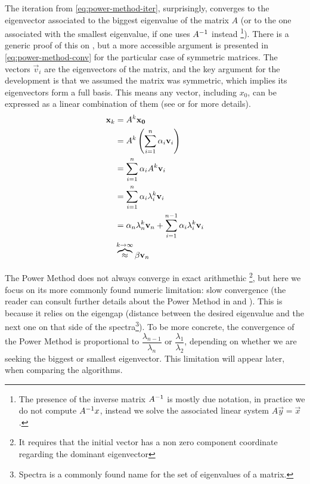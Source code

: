 The iteration from \cref{eq:power-method-iter}, surprisingly,
converges to the eigenvector 
associated to the biggest eigenvalue of the matrix $A$ (or to the one
associated with the smallest eigenvalue, if one uses ${A}^{-1}$ instead
\footnote{The presence of the inverse matrix ${A}^{-1}$ is mostly due
  notation, in practice we do not compute ${A}^{-1}x$, instead we solve the
  associated linear system $A\vec{y} = \vec{x}$.}). There is a
generic proof of this on \cite{saad92}, but a more accessible argument
is presented in \cref{eq:power-method-conv} for the particular case of
symmetric matrices. The vectors 
$\vec{v}_i$ are the eigenvectors of the matrix, and the key argument
for the development is that we
assumed the  matrix was symmetric, which implies its eigenvectors form a full
basis. This means any vector, including $x_0$, can be expressed as a
linear combination of them (see \cite{strang88} or \cite{golub13} for
more details). \\

\begin{align}
  \begin{split}
  \label{eq:power-method-conv}
  \vec{x}_k &= A^{k}\vec{x_0} \\
  &= A^{k}\left(\sum\limits_{\tiny{i=1}}^{n} \alpha_i\vec{v}_i \right) \\
  &= \sum\limits_{\tiny{i=1}}^{n} \alpha_i A^{k} \vec{v}_i  \\
  &= \sum\limits_{\tiny{i=1}}^{n} \alpha_i \lambda_i^{k} \vec{v}_i \\
  &= \alpha_n \lambda_n^{k} \vec{v}_n +
  \sum\limits_{\tiny{i=1}}^{n-1} \alpha_i \lambda_i^{k} \vec{v}_i \\
  & \overbrace{\approx}^{k \to \infty} \beta \vec{v}_n  
  \end{split}
\end{align}


The Power Method does not always converge in exact
arithmethic \footnote{It requires that the initial vector has a non
  zero component coordinate regarding the dominant eigenvector}, but
here we focus on its 
more commonly found numeric limitation: slow convergence (the reader
can consult further details about the Power Method in \cite{golub13}
and \cite{parlett80}). This is
because it relies on the eigengap (distance between the desired eigenvalue and
the next one on that side of the spectra\footnote{Spectra is a
  commonly found name for the set of eigenvalues of a matrix.}). To be
more concrete, the convergence of the Power Method is proportional to
$\dfrac{\lambda_{n-1}}{\lambda_n}$ or $\dfrac{\lambda_1}{\lambda_2}$,
depending on whether we are seeking the  biggest or smallest
eigenvector. This limitation will appear
later, when comparing the algorithms.

